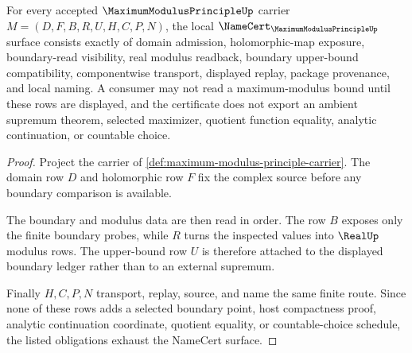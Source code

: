 \begin{theorem}
\label{thm:maximum-modulus-principle-namecert-obligations}
For every accepted $\MaximumModulusPrincipleUp$ carrier $M=(D,F,B,R,U,H,C,P,N)$, the local $\NameCert_{\MaximumModulusPrincipleUp}$ surface consists exactly of domain admission, holomorphic-map exposure, boundary-read visibility, real modulus readback, boundary upper-bound compatibility, componentwise transport, displayed replay, package provenance, and local naming. A consumer may not read a maximum-modulus bound until these rows are displayed, and the certificate does not export an ambient supremum theorem, selected maximizer, quotient function equality, analytic continuation, or countable choice.
\end{theorem}
\begin{proof}
Project the carrier of \autoref{def:maximum-modulus-principle-carrier}. The domain row $D$ and holomorphic row $F$ fix the complex source before any boundary comparison is available.

The boundary and modulus data are then read in order. The row $B$ exposes only the finite boundary probes, while $R$ turns the inspected values into $\RealUp$ modulus rows. The upper-bound row $U$ is therefore attached to the displayed boundary ledger rather than to an external supremum.

Finally $H,C,P,N$ transport, replay, source, and name the same finite route. Since none of these rows adds a selected boundary point, host compactness proof, analytic continuation coordinate, quotient equality, or countable-choice schedule, the listed obligations exhaust the NameCert surface.
\end{proof}

